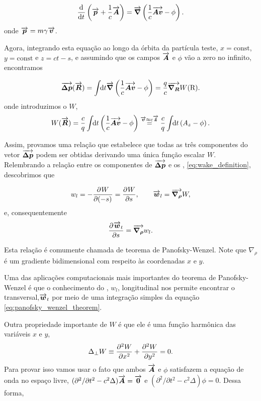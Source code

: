 \begin{equation}
 \dertot{}{t} \left(\vect{p} + \frac1c \vect{A}\right) = \vect{\nabla}\left(\frac1c \vect{Av} - \phi\right).
\end{equation}
onde $\vect{p} = m\gamma\vect{v}$.

Agora, integrando esta equação ao longo da órbita da partícula teste, $x=\mathrm{const}$, $y=\mathrm{const}$ e $z = ct-s$, e assumindo que os campos $\vect{A}$ e $\phi$ vão a zero no infinito, encontramos

\begin{equation}
 \vect{\Delta p}(\vect{R}) = \udefint{t}{\vect{\nabla}\left(\frac1c\vect{Av} - \phi \right) = \frac{q}{c} \vect{\nabla_R}W(\mathrm{R})}.
\end{equation}
onde introduzimos o  $W$,
\begin{equation}
 W(\vect{R}) = \frac{c}{q}\udefint{t}{\left(\frac1c \vect{Av} -\phi\right)}
      \overset{\vect{v} \approx c\vect{\hat{z}}}{=}
                 \frac{c}{q}\udefint{t}{\left(A_z -\phi\right)}.
\end{equation}

Assim, provamos uma relação que estabelece que todas as três componentes do vetor $\vect{\Delta p}$ podem ser obtidas derivando uma única função escalar $W$. Relembrando a relação entre os componentes de $\vect{\Delta p}$ e os , \ref{eq:wake_definition}, descobrimos que

\begin{equation}\label{eq:wake_function_definition}
 w_l = - \derpar{W}{(-s)} = \derpar{W}{s},\qquad \vect{w}_l = \vect{\nabla_\rho}W,
\end{equation}
e, consequentemente
\begin{equation}\label{eq:panofsky_wenzel_theorem}
 \derpar{\vect{w}_t}{s} = \vect{\nabla_\rho}w_l.
\end{equation}

Esta relação é comumente chamada de teorema de Panofsky-Wenzel. Note que $\nabla_\rho$ é um gradiente bidimensional com respeito às coordenadas $x$ e $y$.

Uma das aplicações computacionais mais importantes do teorema de Panofsky-Wenzel é que o conhecimento do , $w_l$, longitudinal nos permite encontrar o  transversal,$\vect{w}_t$ por meio de uma integração simples da equação \ref{eq:panofsky_wenzel_theorem}.

Outra propriedade importante de $W$ é que ele é uma função harmônica das variáveis $x$ e $y$,
\begin{equation}\label{eq:wake_potential_harmonic}
 \Delta_\perp W \equiv \derpar[2]{W}{x} + \derpar[2]{W}{y} = 0.
\end{equation}
Para provar isso vamos usar o fato que ambos $\vect{A}$ e $\phi$ satisfazem a equação de onda no espaço livre, $(\partial^2/\partial t^2 - c^2 \Delta)\vect{A} = \vect{0}$ e $(\partial^2/\partial t^2 - c^2 \Delta)\phi = 0$. Dessa forma,

